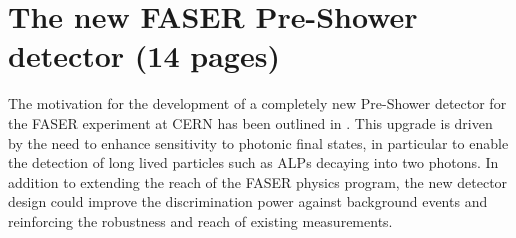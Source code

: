 \chapter{The new FASER Pre-Shower detector (14 pages)}

% 
% 
% 

The motivation for the development of a completely new Pre-Shower detector for the FASER experiment at CERN has been outlined in . This upgrade is driven by the need to enhance sensitivity to photonic final states, in particular to enable the detection of long lived particles such as ALPs decaying into two photons. In addition to extending the reach of the FASER physics program, the new detector design could improve the discrimination power against background events and reinforcing the robustness and reach of existing measurements. \\

